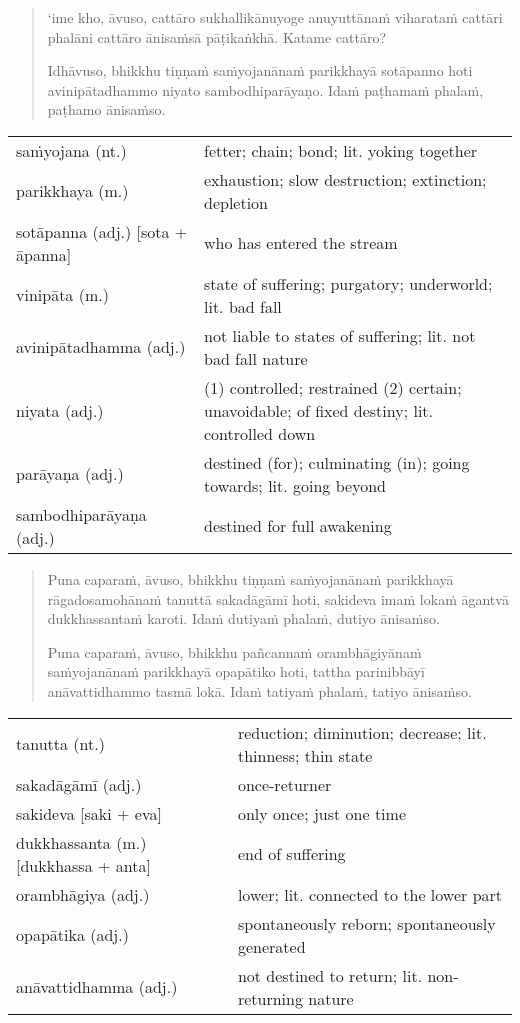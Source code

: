 \documentclass[11pt,oneside]{memoir}
\begin{document}
\begin{quote}
‘ime kho, āvuso, cattāro sukhallikānuyoge anuyuttānaṁ viharataṁ cattāri phalāni
cattāro ānisaṁsā pāṭikaṅkhā. Katame cattāro?

Idhāvuso, bhikkhu tiṇṇaṁ saṁyojanānaṁ parikkhayā sotāpanno hoti avinipātadhammo
niyato sambodhiparāyaṇo. Idaṁ paṭhamaṁ phalaṁ, paṭhamo ānisaṁso.
\end{quote}

\begin{longtable}{L{\colOne} L{\colTwo}}
saṁyojana (nt.) & fetter; chain; bond; lit. yoking together\\[0pt]
parikkhaya (m.) & exhaustion; slow destruction; extinction; depletion\\[0pt]
sotāpanna (adj.) [sota + āpanna] & who has entered the stream\\[0pt]
vinipāta (m.) & state of suffering; purgatory; underworld; lit. bad fall\\[0pt]
avinipātadhamma (adj.) & not liable to states of suffering; lit. not bad fall nature\\[0pt]
niyata (adj.) & (1) controlled; restrained (2) certain; unavoidable; of fixed destiny; lit. controlled down\\[0pt]
parāyaṇa (adj.) & destined (for); culminating (in); going towards; lit. going beyond\\[0pt]
sambodhiparāyaṇa (adj.) & destined for full awakening\\[0pt]
\end{longtable}

\begin{quote}
Puna caparaṁ, āvuso, bhikkhu tiṇṇaṁ saṁyojanānaṁ parikkhayā rāgadosamohānaṁ
tanuttā sakadāgāmī hoti, sakideva imaṁ lokaṁ āgantvā dukkhassantaṁ karoti. Idaṁ
dutiyaṁ phalaṁ, dutiyo ānisaṁso.

Puna caparaṁ, āvuso, bhikkhu pañcannaṁ orambhāgiyānaṁ saṁyojanānaṁ parikkhayā
opapātiko hoti, tattha parinibbāyī anāvattidhammo tasmā lokā. Idaṁ tatiyaṁ
phalaṁ, tatiyo ānisaṁso.
\end{quote}

\begin{longtable}{L{\colOne} L{\colTwo}}
tanutta (nt.) & reduction; diminution; decrease; lit. thinness; thin state\\[0pt]
sakadāgāmī (adj.) & once-returner\\[0pt]
sakideva [saki + eva] & only once; just one time\\[0pt]
dukkhassanta (m.) [dukkhassa + anta] & end of suffering\\[0pt]
orambhāgiya (adj.) & lower; lit. connected to the lower part\\[0pt]
opapātika (adj.) & spontaneously reborn; spontaneously generated\\[0pt]
anāvattidhamma (adj.) & not destined to return; lit. non-returning nature\\[0pt]
\end{longtable}
\end{document}
